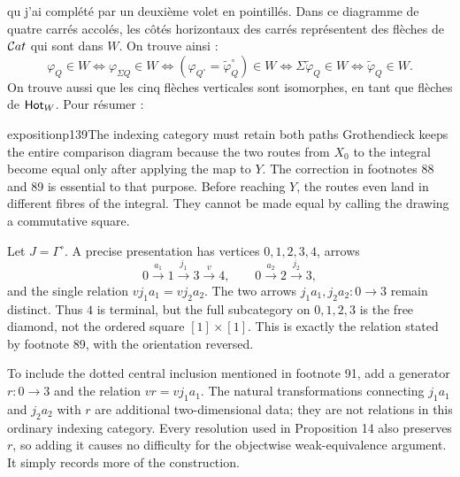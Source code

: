 qu j'ai complété par un deuxième volet en pointillés. Dans ce diagramme de quatre carrés accolés, les côtés horizontaux des carrés représentent des flèches de $\mathcal{C}at$ qui sont dans $W$. On trouve ainsi : %
\[
\varphi_Q\in W \iff \varphi_{\Sigma Q}\in W \iff (\varphi_{Q^\circ}=\tilde{\varphi}_Q^\circ)\in W \iff \Sigma\tilde{\varphi}_Q\in W \iff \tilde{\varphi}_Q\in W.
\]
On trouve aussi que les cinq flèches verticales sont isomorphes, en tant que flèches de $\mathsf{Hot}_W$. Pour résumer :

\begin{dcomment}{exposition}{p139}{The indexing category must retain both paths}
Grothendieck keeps the entire comparison diagram because the two routes from $X_0$ to the integral become equal only after applying the map to $Y$. The correction in footnotes 88 and 89 is essential to that purpose. Before reaching $Y$, the routes even land in different fibres of the integral. They cannot be made equal by calling the drawing a commutative square.

Let $J=\Gamma^\circ$. A precise presentation has vertices $0,1,2,3,4$, arrows
\[
 0\xrightarrow{a_1}1\xrightarrow{j_1}3\xrightarrow{v}4,
 \qquad
 0\xrightarrow{a_2}2\xrightarrow{j_2}3,
\]
and the single relation $v j_1a_1=v j_2a_2$. The two arrows $j_1a_1,j_2a_2:0\to3$ remain distinct. Thus $4$ is terminal, but the full subcategory on $0,1,2,3$ is the free diamond, not the ordered square $[1]\times[1]$. This is exactly the relation stated by footnote 89, with the orientation reversed.

To include the dotted central inclusion mentioned in footnote 91, add a generator $r:0\to3$ and the relation $vr=vj_1a_1$. The natural transformations connecting $j_1a_1$ and $j_2a_2$ with $r$ are additional two-dimensional data; they are not relations in this ordinary indexing category. Every resolution used in Proposition 14 also preserves $r$, so adding it causes no difficulty for the objectwise weak-equivalence argument. It simply records more of the construction.
\end{dcomment}


